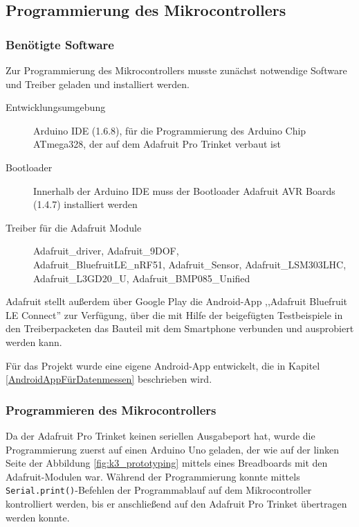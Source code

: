 \subsection{Programmierung des Mikrocontrollers}
\label{kapitel_programmierungMikrocontroller}

\subsubsection{Benötigte Software}

Zur Programmierung des Mikrocontrollers musste zunächst notwendige Software und Treiber geladen und installiert werden.

\begin{description}
	\item[Entwicklungsumgebung] Arduino IDE (1.6.8), für die Programmierung des Arduino Chip ATmega328, der auf dem Adafruit Pro Trinket verbaut ist
	\item[Bootloader] Innerhalb der Arduino IDE muss der Bootloader Adafruit AVR Boards (1.4.7) installiert werden
	\item[Treiber für die Adafruit Module] Adafruit\_driver, Adafruit\_9DOF, \\ Adafruit\_BluefruitLE\_nRF51, Adafruit\_Sensor, Adafruit\_LSM303LHC, \\ Adafruit\_L3GD20\_U, Adafruit\_BMP085\_Unified
\end{description}

Adafruit stellt außerdem über Google Play die Android-App ,,Adafruit Bluefruit LE Connect'' zur Verfügung, über die mit Hilfe der beigefügten Testbeispiele in den Treiberpacketen das Bauteil mit dem Smartphone verbunden und ausprobiert werden kann. 

Für das Projekt wurde eine eigene Android-App entwickelt, die in Kapitel \ref{AndroidAppFürDatenmessen} beschrieben wird.

\subsubsection{Programmieren des Mikrocontrollers}
Da der Adafruit Pro Trinket keinen seriellen Ausgabeport hat, wurde die Programmierung zuerst auf einen Arduino Uno geladen, der wie auf der linken Seite der Abbildung \ref{fig:k3_prototyping} mittels eines Breadboards mit den Adafruit-Modulen war. Während der Programmierung konnte mittels \texttt{Serial.print()}-Befehlen der Programmablauf auf dem Mikrocontroller kontrolliert werden, bis er anschließend auf den Adafruit Pro Trinket übertragen werden konnte.

